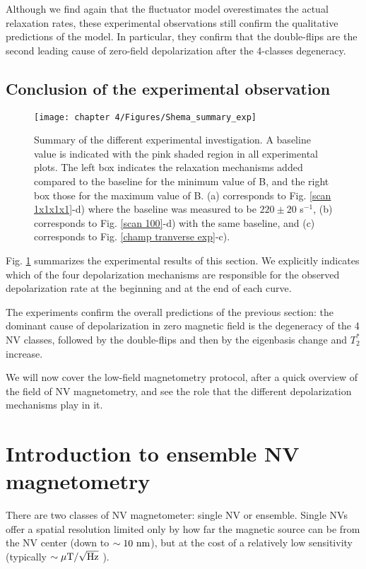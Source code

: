 \documentclass[a4paper, 11pt]{book}
\begin{document}
Although we find again that the fluctuator model overestimates the actual relaxation rates, these experimental observations still confirm the qualitative predictions of the model. In particular, they confirm that the double-flips are the second leading cause of zero-field depolarization after the 4-classes degeneracy.

\subsection{Conclusion of the experimental observation}

\begin{figure}[h!]
\centering
\texttt{[image: chapter 4/Figures/Shema\_summary\_exp]}
\caption{Summary of the different experimental investigation. A baseline value is indicated with the pink shaded region in all experimental plots. The left box indicates the relaxation mechanisms added compared to the baseline for the minimum value of B, and the right box those for the maximum value of B. (a) corresponds to Fig. \ref{scan 1x1x1x1}-d) where the baseline was measured to be $220\pm 20$ s$^{-1}$, (b) corresponds to Fig. \ref{scan 100}-d) with the same baseline, and (c) corresponds to Fig. \ref{champ tranverse exp}-c).}
\label{summary_exp}
\end{figure}

Fig. \ref{summary_exp} summarizes the experimental results of this section. We explicitly indicates which of the four depolarization mechanisms are responsible for the observed depolarization rate at the beginning and at the end of each curve.

The experiments confirm the overall predictions of the previous section: the dominant cause of depolarization in zero magnetic field is the degeneracy of the 4 NV classes, followed by the double-flips and then by the eigenbasis change and $T_2^*$ increase.

We will now cover the low-field magnetometry protocol, after a quick overview of the field of NV magnetometry, and see the role that the different depolarization mechanisms play in it.


\section{Introduction to ensemble NV magnetometry}
\label{sec 4.4}

There are two classes of NV magnetometer: single NV or ensemble. Single NVs offer a spatial resolution limited only by how far the magnetic source can be from the NV center (down to $\sim 10\ \rm nm$), but at the cost of a relatively low sensitivity (typically $\sim \mu \rm{T} / \sqrt{\rm Hz}$ \citep{pelliccione2016scanned}).
\end{document}
